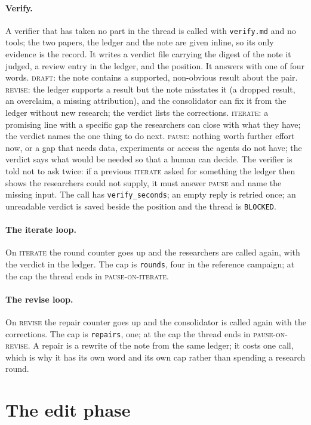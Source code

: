 \documentclass[11pt,a4paper]{article}
\newcommand{\st}[1]{\textsc{#1}}
\newcommand{\file}[1]{\texttt{#1}}
\begin{document}
\paragraph{Verify.} A verifier that has taken no part in the thread is called with
\file{verify.md} and no tools; the two papers, the ledger and the note are given inline, so its
only evidence is the record. It writes a verdict file carrying the digest of the note it
judged, a review entry in the ledger, and the position. It answers with one of four words.
\st{draft}: the note contains a supported, non-obvious result about the pair. \st{revise}: the
ledger supports a result but the note misstates it (a dropped result, an overclaim, a missing
attribution), and the consolidator can fix it from the ledger without new research; the
verdict lists the corrections. \st{iterate}: a promising line with a specific gap the
researchers can close with what they have; the verdict names the one thing to do next.
\st{pause}: nothing worth further effort now, or a gap that needs data, experiments or access
the agents do not have; the verdict says what would be needed so that a human can decide. The
verifier is told not to ask twice: if a previous \st{iterate} asked for something the ledger
then shows the researchers could not supply, it must answer \st{pause} and name the missing
input. The call has \file{verify\_seconds}; an empty reply is retried once; an unreadable
verdict is saved beside the position and the thread is \file{BLOCKED}.

\paragraph{The iterate loop.} On \st{iterate} the round counter goes up and the researchers
are called again, with the verdict in the ledger. The cap is \file{rounds}, four in the
reference campaign; at the cap the thread ends in \st{pause-on-iterate}.

\paragraph{The revise loop.} On \st{revise} the repair counter goes up and the consolidator is
called again with the corrections. The cap is \file{repairs}, one; at the cap the thread ends
in \st{pause-on-revise}. A repair is a rewrite of the note from the same ledger; it costs one
call, which is why it has its own word and its own cap rather than spending a research round.

\section{The edit phase}
\end{document}
